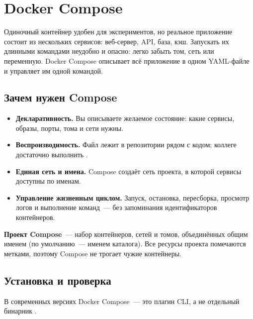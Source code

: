 \chapter{Docker Compose}

Одиночный контейнер удобен для экспериментов, но реальное приложение
состоит из нескольких сервисов: веб-сервер, API, база, кэш. Запускать
их длинными командами  неудобно и опасно: легко забыть
том, сеть или переменную. Docker Compose описывает всё приложение
в одном YAML-файле и управляет им одной командой.

\section{Зачем нужен Compose}

\begin{itemize}
  \item \textbf{Декларативность.} Вы описываете желаемое состояние:
        какие сервисы, образы, порты, тома и сети нужны.
  \item \textbf{Воспроизводимость.} Файл лежит в репозитории рядом
        с кодом; коллеге достаточно выполнить .
  \item \textbf{Единая сеть и имена.} Compose создаёт сеть проекта,
        в которой сервисы доступны по именам.
  \item \textbf{Управление жизненным циклом.} Запуск, остановка,
        пересборка, просмотр логов и выполнение команд~--- без
        запоминания идентификаторов контейнеров.
\end{itemize}

\begin{defbox}
\textbf{Проект Compose}~--- набор контейнеров, сетей и томов,
объединённых общим именем (по умолчанию~--- именем каталога).
Все ресурсы проекта помечаются метками, поэтому Compose не трогает
чужие контейнеры.
\end{defbox}

\section{Установка и проверка}

В современных версиях Docker Compose~--- это плагин CLI, а не отдельный
бинарник .



